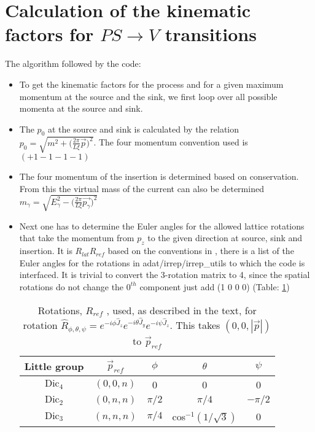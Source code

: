 \documentclass[10pt]{article}
\begin{document}
\section{Calculation of the kinematic factors for $PS \rightarrow V$ transitions}
The algorithm followed by the code:
\begin{itemize}
	\item To get the kinematic factors for the process and for a given maximum momentum at the source and the sink, we first loop over all possible momenta at the source and sink.
	\item The $p_0$ at the source and sink is calculated by the relation $p_0 = \sqrt{m^2 + \Big(\frac{2\pi}{L\xi} \vec{p}\Big)^2}$. The four momentum convention used is $(+1 -1 -1 -1)$
	\item The four momentum of the insertion is determined based on conservation. From this the virtual mass of the current can also be determined $m_{\gamma} = \sqrt{E_{\gamma}^2 - \Big(\frac{2\pi}{L\xi} \vec{p_{\gamma}} \Big)^2} $
	\item Next one has to determine the Euler angles for the allowed lattice rotations that take the momentum from $p_z$ to the given direction at source, sink and insertion. It is $R_{lat}R_{ref}$ based on the conventions in \cite{hel}, there is a list of the Euler angles for the rotations in {\myfont adat/irrep/irrep_utils} to which the code is interfaced. It is trivial to convert the 3-rotation matrix to 4, since the spatial rotations do not change the $0^{th}$ component just add (1 0 0 0) (Table: \ref{ref_rot})

\begin{table}[!htbp]
\centering
\hspace{9mm}
\begin{minipage}{0.5\linewidth}
\begin{tabular}{c|c|c|c|c}
\centering
Little group & $\vec{p}_{ref}$ & $\phi$ & $\theta$ & $\psi$ \\ 
\hline
$\mbox{Dic}_4$ & $(0,0,n)$ & 0 & 0 & 0\\
$\mbox{Dic}_2$ & $(0,n,n)$ & $\pi/2$& $\pi/4$ & $-\pi/2$ \\
$\mbox{Dic}_3$ & $(n,n,n)$ & $\pi/4$ & cos$^{-1}(1/\sqrt{3})$ & 0\\
\end{tabular}
\end{minipage}
\caption{Rotations, $R_{ref}$ , used, as described in the text, for rotation $\hat{R}_{\phi,\theta,\psi} = e^{-i\phi\hat{J}_z}e^{-i\theta\hat{J}_y}e^{-i\psi\hat{J}_z}$. This takes $(0,0,|\vec{p}|)$ to $\vec{p}_{ref}$}
\label{ref_rot}
\end{table}


\end{itemize}
\end{document}
